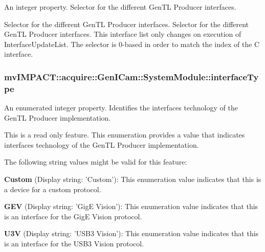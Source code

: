 An integer property. Selector for the different Gen\+T\+L Producer interfaces. 

Selector for the different Gen\+T\+L Producer interfaces. Selector for the different Gen\+T\+L Producer interfaces. This interface list only changes on execution of Interface\+Update\+List. The selector is 0-\/based in order to match the index of the C interface. \hypertarget{classmv_i_m_p_a_c_t_1_1acquire_1_1_gen_i_cam_1_1_system_module_ae81236e2c1b6a29de2c2863517929b45}{
\subsubsection[{interface\+Type}]{ mv\+I\+M\+P\+A\+C\+T\+::acquire\+::\+Gen\+I\+Cam\+::\+System\+Module\+::interface\+Type}}\label{classmv_i_m_p_a_c_t_1_1acquire_1_1_gen_i_cam_1_1_system_module_ae81236e2c1b6a29de2c2863517929b45}


An enumerated integer property. Identifies the interfaces technology of the Gen\+T\+L Producer implementation. 

This is a read only feature. This enumeration provides a value that indicates interfaces technology of the Gen\+T\+L Producer implementation.

The following string values might be valid for this feature\+:
\begin{DoxyItemize}
\item {\bfseries Custom} (Display string\+: 'Custom')\+: This enumeration value indicates that this is a device for a custom protocol.
\item {\bfseries G\+E\+V} (Display string\+: 'Gig\+E Vision')\+: This enumeration value indicates that this is an interface for the Gig\+E Vision protocol.
\item {\bfseries U3\+V} (Display string\+: 'U\+S\+B3 Vision')\+: This enumeration value indicates that this is an interface for the U\+S\+B3 Vision protocol.
\end{DoxyItemize}

